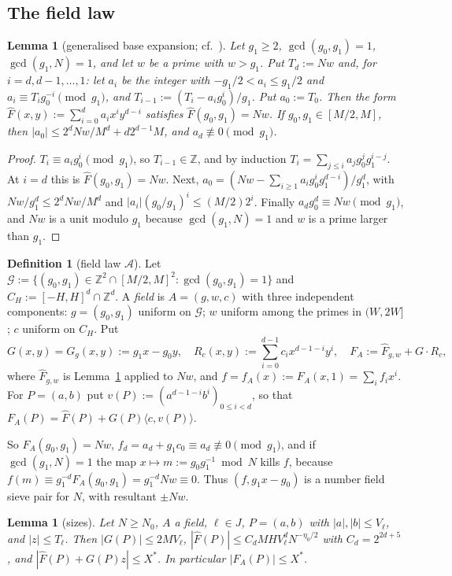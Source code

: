 \documentclass[11pt]{amsart}
\newtheorem{lemma}[theorem]{Lemma}
\theoremstyle{definition}
\newtheorem{definition}[theorem]{Definition}
\newcommand{\Z}{\mathbb{Z}}
\newcommand{\cA}{\mathcal{A}}
\newcommand{\cG}{\mathcal{G}}
\newcommand{\XF}{X^{*}}
\begin{document}
\subsection{The field law}\label{sec:field}

\begin{lemma}[generalised base expansion; cf.\ {\cite[\S3]{blp1993}}]\label{lem:GB}
Let $g_1\ge2$, $\gcd(g_0,g_1)=1$, $\gcd(g_1,N)=1$, and let $w$ be a prime with $w>g_1$. Put $T_d:=Nw$
and, for $i=d,d-1,\dots,1$: let $a_i$ be the integer with $-g_1/2<a_i\le g_1/2$ and $a_i\equiv T_ig_0^{-i}\pmod{g_1}$,
and $T_{i-1}:=(T_i-a_ig_0^i)/g_1$. Put $a_0:=T_0$. Then the form $\hat F(x,y):=\sum_{i=0}^da_ix^iy^{d-i}$ satisfies
$\hat F(g_0,g_1)=Nw$. If $g_0,g_1\in[M/2,M]$, then $|a_0|\le2^dNw/M^d+d2^{d-1}M$, and $a_d\not\equiv0\pmod{g_1}$.
\end{lemma}

\begin{proof}
$T_i\equiv a_ig_0^i\pmod{g_1}$, so $T_{i-1}\in\Z$, and by induction $T_i=\sum_{j\le i}a_jg_0^jg_1^{i-j}$.
At $i=d$ this is $\hat F(g_0,g_1)=Nw$. Next, $a_0=(Nw-\sum_{i\ge1}a_ig_0^ig_1^{d-i})/g_1^d$, with $Nw/g_1^d\le2^dNw/M^d$
and $|a_i|(g_0/g_1)^i\le(M/2)2^i$. Finally $a_dg_0^d\equiv Nw\pmod{g_1}$, and $Nw$ is a unit modulo $g_1$
because $\gcd(g_1,N)=1$ and $w$ is a prime larger than $g_1$.
\end{proof}

\begin{definition}[field law $\cA$]\label{def:field}
Let $\cG:=\{(g_0,g_1)\in\Z^2\cap[M/2,M]^2:\gcd(g_0,g_1)=1\}$ and $C_H:=[-H,H]^d\cap\Z^d$. A \emph{field}
is $A=(g,w,c)$ with three independent components: $g=(g_0,g_1)$ uniform on $\cG$; $w$ uniform among the primes
in $(W,2W]$; $c$ uniform on $C_H$. Put
\[
G(x,y)=G_g(x,y):=g_1x-g_0y,\quad R_c(x,y):=\sum_{i=0}^{d-1}c_ix^{d-1-i}y^i,\quad F_A:=\hat F_{g,w}+G\cdot R_c,
\]
where $\hat F_{g,w}$ is Lemma~\ref{lem:GB} applied to $Nw$, and $f=f_A(x):=F_A(x,1)=\sum_if_ix^i$. For $P=(a,b)$ put
$v(P):=(a^{d-1-i}b^i)_{0\le i<d}$, so that $F_A(P)=\hat F(P)+G(P)\langle c,v(P)\rangle$.
\end{definition}

So $F_A(g_0,g_1)=Nw$, $f_d=a_d+g_1c_0\equiv a_d\not\equiv0\pmod{g_1}$, and if $\gcd(g_1,N)=1$ the map
$x\mapsto m:=g_0g_1^{-1}\bmod N$ kills $f$, because $f(m)\equiv g_1^{-d}F_A(g_0,g_1)=g_1^{-d}Nw\equiv0$. Thus
$(f,g_1x-g_0)$ is a number field sieve pair for $N$, with resultant $\pm Nw$.

\begin{lemma}[sizes]\label{lem:valuesizes}
Let $N\ge N_0$, $A$ a field, $\ell\in J$, $P=(a,b)$ with $|a|,|b|\le V_\ell$, and $|z|\le T_\ell$. Then
$|G(P)|\le2MV_\ell$, $|\hat F(P)|\le C_dMHV_\ell^dN^{-\eta_0/2}$ with $C_d=2^{2d+5}$, and
$|\hat F(P)+G(P)z|\le\XF$. In particular $|F_A(P)|\le\XF$.
\end{lemma}
\end{document}
